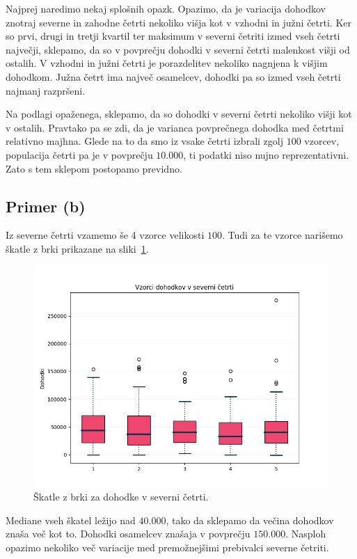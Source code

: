\documentclass[a4paper,11pt]{article}
\begin{document}
Najprej naredimo nekaj splošnih opazk.
Opazimo, da je variacija dohodkov znotraj severne in zahodne četrti nekoliko višja kot v vzhodni in južni četrti. 
Ker so prvi, drugi in tretji kvartil ter maksimum v severni četriti izmed vseh četrti največji, 
sklepamo, da so v povprečju dohodki v severni četrti malenkost višji od ostalih. 
V vzhodni in južni četrti je porazdelitev nekoliko nagnjena k višjim dohodkom. 
Južna četrt ima največ osamelcev, dohodki pa so izmed vseh četrti najmanj razpršeni.

Na podlagi opaženega, sklepamo, da so dohodki v severni četrti nekoliko višji kot v ostalih.
Pravtako pa se zdi, da je varianca povprečnega dohodka med četrtmi relativno majhna.
Glede na to da smo iz vsake četrti izbrali zgolj $100$ vzorcev, populacija četrti pa je v povprečju $10.000$, ti podatki niso nujno reprezentativni.
Zato s tem sklepom postopamo previdno.

\subsection*{Primer (b)}

Iz severne četrti vzamemo še 4 vzorce velikosti $100$.
Tudi za te vzorce narišemo škatle z brki prikazane na sliki~\ref{brke_sever}.

\begin{figure}[H]
    \centering
    \includegraphics[scale=0.65]{Skatle_z_brki_Sever.png}
    \caption{Škatle z brki za dohodke v severni četrti.}
    \label{brke_sever}
\end{figure}

Mediane vseh škatel ležijo nad $40.000$, tako da sklepamo da večina dohodkov znaša več kot to.
Dohodki osamelcev znašaja v povprečju $150.000$.
Nasploh opazimo nekoliko več variacije med premožnejšimi prebivalci severne četriti.
\end{document}
